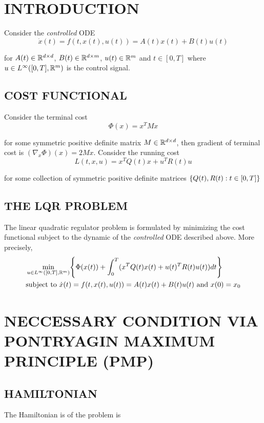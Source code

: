 \section{INTRODUCTION}

Consider the \textit{controlled} ODE
$$
	\dot{x}(t) = f(t, x(t), u(t)) = A(t) x(t) + B(t) u(t)
$$

for $A(t) \in \mathbb{R}^{d \times d}$, $B(t) \in \mathbb{R}^{d \times m}$, $u(t) \in \mathbb{R}^m$ and $t \in [0, T]$ where $u \in L^\infty([0, T], \mathbb{R}^m)$ is the control signal.

\subsection{COST FUNCTIONAL}

Consider the terminal cost
$$
	\Phi(x) = x^T M x
$$
	
for some symmetric positive definite matrix $M \in \mathbb{R}^{d \times d}$, then gradient of terminal cost is $(\nabla_x \Phi)(x) = 2Mx$. Consider the running cost
$$
	L(t, x, u) = x^T Q(t) x + u^T R(t) u
$$

for some collection of symmetric positive definite matrices $\{Q(t), R(t): t \in [0, T]\}$

\subsection{THE LQR PROBLEM}

The linear quadratic regulator problem is formulated by minimizing the cost functional subject to the dynamic of the \textit{controlled} ODE described above. More precisely,
\begin{align*}
	&\min_{u \in L^\infty([0, T], \R^m)} \set*{\Phi(x(t)) + \int_0^T (x^T Q(t) x(t) + u(t)^T R(t) u(t)) dt} \\
	&\text{subject to } \dot{x}(t) = f(t, x(t), u(t)) = A(t) x(t) + B(t) u(t) \text{ and } x(0) = x_0
\end{align*}

\section{NECCESSARY CONDITION VIA PONTRYAGIN MAXIMUM PRINCIPLE (PMP)}

\subsection{HAMILTONIAN}

The Hamiltonian is of the problem is

